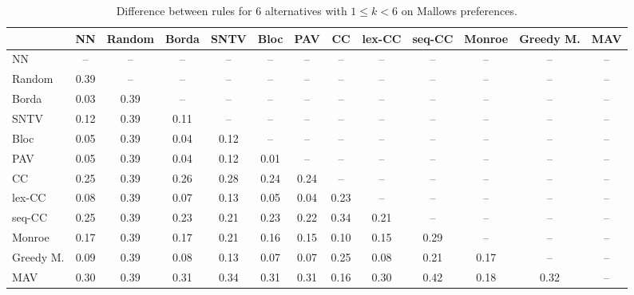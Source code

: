 
\begin{table*}[h!]
\centering
\begin{tabular}{lcccccccccccc}
\toprule
 & NN & Random & Borda & SNTV & Bloc & PAV & CC & lex-CC & seq-CC & Monroe & Greedy M. & MAV \\
\midrule
NN & -- & -- & -- & -- & -- & -- & -- & -- & -- & -- & -- & -- \\
Random & 0.39 & -- & -- & -- & -- & -- & -- & -- & -- & -- & -- & -- \\
Borda & 0.03 & 0.39 & -- & -- & -- & -- & -- & -- & -- & -- & -- & -- \\
SNTV & 0.12 & 0.39 & 0.11 & -- & -- & -- & -- & -- & -- & -- & -- & -- \\
Bloc & 0.05 & 0.39 & 0.04 & 0.12 & -- & -- & -- & -- & -- & -- & -- & -- \\
PAV & 0.05 & 0.39 & 0.04 & 0.12 & 0.01 & -- & -- & -- & -- & -- & -- & -- \\
CC & 0.25 & 0.39 & 0.26 & 0.28 & 0.24 & 0.24 & -- & -- & -- & -- & -- & -- \\
lex-CC & 0.08 & 0.39 & 0.07 & 0.13 & 0.05 & 0.04 & 0.23 & -- & -- & -- & -- & -- \\
seq-CC & 0.25 & 0.39 & 0.23 & 0.21 & 0.23 & 0.22 & 0.34 & 0.21 & -- & -- & -- & -- \\
Monroe & 0.17 & 0.39 & 0.17 & 0.21 & 0.16 & 0.15 & 0.10 & 0.15 & 0.29 & -- & -- & -- \\
Greedy M. & 0.09 & 0.39 & 0.08 & 0.13 & 0.07 & 0.07 & 0.25 & 0.08 & 0.21 & 0.17 & -- & -- \\
MAV & 0.30 & 0.39 & 0.31 & 0.34 & 0.31 & 0.31 & 0.16 & 0.30 & 0.42 & 0.18 & 0.32 & -- \\
\bottomrule
\end{tabular}

\caption{Difference between rules for 6 alternatives with $1 \leq k < 6$ on Mallows preferences.}
\end{table*}
